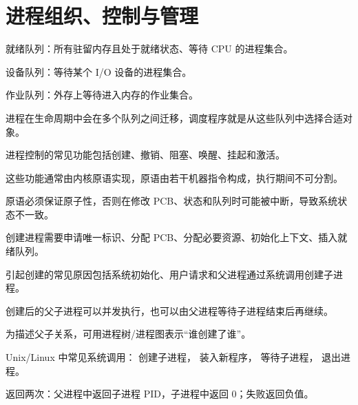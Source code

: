 \section{进程组织、控制与管理}
\begin{points}
  \item 就绪队列：所有驻留内存且处于就绪状态、等待 CPU 的进程集合。
  \item 设备队列：等待某个 I/O 设备的进程集合。
  \item 作业队列：外存上等待进入内存的作业集合。
  \item 进程在生命周期中会在多个队列之间迁移，调度程序就是从这些队列中选择合适对象。
\end{points}


\begin{points}
  \item 进程控制的常见功能包括创建、撤销、阻塞、唤醒、挂起和激活。
  \item 这些功能通常由内核原语实现，原语由若干机器指令构成，执行期间不可分割。
  \item 原语必须保证原子性，否则在修改 PCB、状态和队列时可能被中断，导致系统状态不一致。
\end{points}


\begin{points}
  \item 创建进程需要申请唯一标识、分配 PCB、分配必要资源、初始化上下文、插入就绪队列。
  \item 引起创建的常见原因包括系统初始化、用户请求和父进程通过系统调用创建子进程。
  \item 创建后的父子进程可以并发执行，也可以由父进程等待子进程结束后再继续。
  \item 为描述父子关系，可用进程树/进程图表示“谁创建了谁”。
  \item Unix/Linux 中常见系统调用： 创建子进程， 装入新程序， 等待子进程， 退出进程。
  \item {} 返回两次：父进程中返回子进程 PID，子进程中返回 0；失败返回负值。
\end{points}


